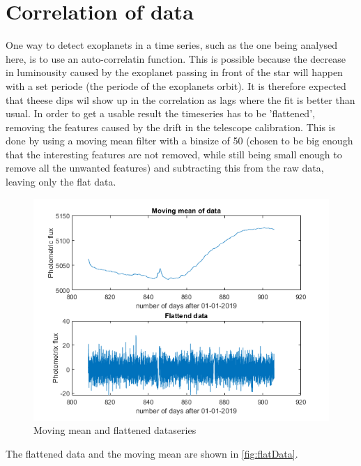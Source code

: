 \section{Correlation of data}

One way to detect exoplanets in a time series, such as the one being analysed here, is to use an auto-correlatin function. This is possible because the decrease in luminousity caused by the exoplanet passing in front of the star will happen with a set periode (the periode of the exoplanets orbit). It is therefore expected that theese dips wil show up in the correlation as lags where the fit is better than usual. In order to get a usable result the timeseries has to be 'flattened', removing the features caused by the drift in the telescope calibration. This is done by using a moving mean filter with a binsize of 50 (chosen to be big enough that the interesting features are not removed, while still being small enough to remove all the unwanted features) and subtracting this from the raw data, leaving only the flat data. \\

\begin{figure}[h]
\centering
\includegraphics[widht=\textwidth]{matlabstuff/flat_data.png}
\caption{Moving mean and flattened dataseries}
\label{fig:flatData}
\end{figure}

The flattened data and the moving mean are shown in \autoref{fig:flatData}.\\

